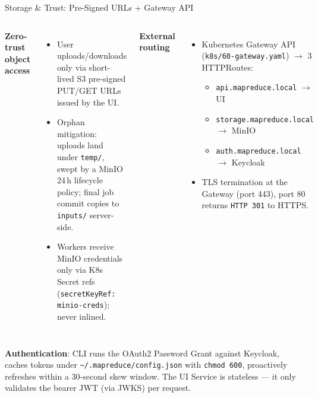 \documentclass[11pt]{beamer}
\begin{document}
\begin{frame}{Storage \& Trust: Pre-Signed URLs + Gateway API}
\begin{columns}[T]
\textbf{Zero-trust object access}
\begin{itemize}\scriptsize
  \item User uploads/downloads only via short-lived
        \alert{S3 pre-signed PUT/GET URLs} issued by the UI.
  \item Orphan mitigation: uploads land under \texttt{temp/}, swept by a MinIO
        \alert{24\,h lifecycle policy}; final job commit copies to \texttt{inputs/}
        server-side.
  \item Workers receive MinIO credentials only via K8s Secret refs
        (\texttt{secretKeyRef: minio-creds}); never inlined.
\end{itemize}

\textbf{External routing}
\begin{itemize}\scriptsize
  \item Kubernetes \alert{Gateway API} (\texttt{k8s/60-gateway.yaml})
        $\to$ 3 HTTPRoutes:
        \begin{itemize}\tiny
          \item \texttt{api.mapreduce.local} $\to$ UI
          \item \texttt{storage.mapreduce.local} $\to$ MinIO
          \item \texttt{auth.mapreduce.local} $\to$ Keycloak
        \end{itemize}
  \item \alert{TLS termination at the Gateway} (port 443),
        port 80 returns \texttt{HTTP 301} to HTTPS.
\end{itemize}
\end{columns}

\vspace{0.4em}
\scriptsize
\textbf{Authentication}: CLI runs the OAuth2 Password Grant against Keycloak,
caches tokens under \texttt{\textasciitilde/.mapreduce/config.json} with \texttt{chmod 600},
proactively refreshes within a 30-second skew window. The UI Service is
\alert{stateless} --- it only validates the bearer JWT (via JWKS) per request.
\end{frame}

\end{document}
